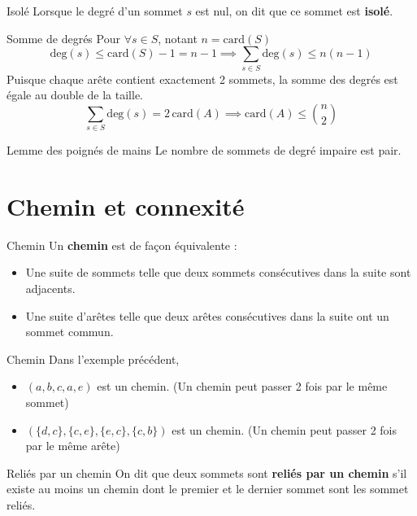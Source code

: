 \begin{Definition}[colbacktitle=red!75!black]{Isolé}{}
Lorsque le degré d'un sommet $s$ est nul, on dit que ce sommet est \textbf{isolé}.
\end{Definition}


\begin{Prop}{Somme de degrés}{}
Pour $\forall s \in S$,  notant $n = \mathrm{card}(S)$
\[
  \mathrm{deg}(s) \le \mathrm{card}(S) - 1 = n-1 \implies \sum_{s \in S} \mathrm{deg}(s) \le n(n-1)
\]
Puisque chaque arête contient exactement 2 sommets, la somme des degrés est égale au double de la taille.
 \[
   \sum_{s \in S} \mathrm{deg} (s) = 2 \,\mathrm{car d} (A) \implies \mathrm{card}(A) \le \binom{n}{2}
\]
\end{Prop}


\begin{Corollary}{Lemme des poignés de mains}{}
Le nombre de sommets de degré impaire est pair.
\end{Corollary}


\section{Chemin et connexité}

\begin{Definition}[colbacktitle=red!75!black]{Chemin}{}
Un \textbf{chemin} est de façon équivalente :
\begin{itemize}
    \item Une suite de sommets telle que deux sommets consécutives dans la suite sont adjacents.
    \item Une suite d'arêtes telle que deux arêtes consécutives dans la suite ont un sommet commun.
\end{itemize}
\end{Definition}

\begin{Example}{Chemin}{}
Dans l'exemple précédent,
\begin{itemize}
    \item $(a,b,c,a,e)$ est un chemin. (Un chemin peut passer 2 fois par le même sommet)
    \item $(\{d,c\},\{c,e\}, \{e, c\}, \{c,b\})$ est un chemin. (Un chemin peut passer 2 fois par le même arête)
\end{itemize}
\end{Example}

\begin{Definition}[colbacktitle=red!75!black]{Reliés par un chemin}{}
On dit que deux sommets sont \textbf{reliés par un chemin} s'il existe au moins un chemin dont le premier et le dernier sommet sont les sommet reliés.
\end{Definition}

